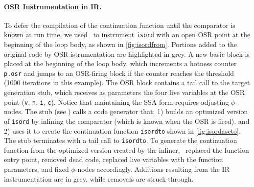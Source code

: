 \paragraph{OSR Instrumentation in IR.}
To defer the compilation of the continuation function until the comparator is known at run time, we used \osrkit\ to instrument {\tt isord} with an open OSR point at the beginning of the loop body, as shown in \myfigure\ref{fig:isordfrom}. Portions added to the original code by OSR istrumentation are highlighted in grey.
A new basic block is placed at the beginning of the loop body, which increments a hotness counter {\tt p.osr} and jumps to an OSR-firing block if the counter reaches the threshold (1000 iterations in this example). The OSR block contains a tail call to the target generation stub, which receives as parameters the four live variables at the OSR point ({\tt v}, {\tt n}, {\tt i}, {\tt c}). Notice that maintaining the SSA form requires adjusting $\phi$-nodes. The stub (see \myfigure[...]) calls a code generator that: 1) builds an optimized version of {\tt isord} by inlining the comparator (which is known when the OSR is fired), and 2) uses it to create the continuation function {\tt isordto} shown in \myfigure\ref{fig:isordascto}. The stub terminates with a tail call to {\tt isordto}. To generate the continuation function from the optimized version created by the inliner, \osrkit\ replaced the function entry point, removed dead code, replaced live variables with the function parameters, and fixed $\phi$-nodes accordingly. Additions resulting from the IR instrumentation are in grey, while removals are struck-through.


